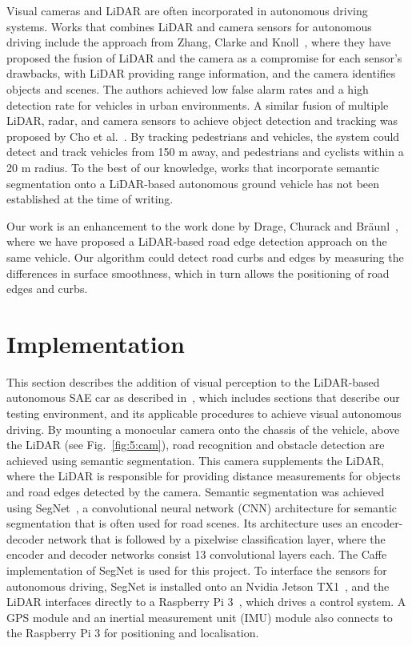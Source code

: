 Visual cameras and LiDAR are often incorporated in autonomous driving systems. Works that combines LiDAR and camera sensors for autonomous driving include the approach from Zhang, Clarke and Knoll~\cite{f._zhang_vehicle_2014}, where they have proposed the fusion of LiDAR and the camera as a compromise for each sensor's drawbacks, with LiDAR providing range information, and the camera identifies objects and scenes. The authors achieved low false alarm rates and a high detection rate for vehicles in urban environments.  A similar fusion of multiple LiDAR, radar, and camera sensors to achieve object detection and tracking was proposed by Cho et al.~\cite{h._cho_multi-sensor_2014}. By tracking pedestrians and vehicles, the system could detect and track vehicles from 150 m away, and pedestrians and cyclists within a 20 m radius. To the best of our knowledge, works that incorporate semantic segmentation onto a LiDAR-based autonomous ground vehicle has not been established at the time of writing. 

Our work is an enhancement to the work done by Drage, Churack and Br\"aunl~\cite{drage_lidar_2015}, where we have proposed a LiDAR-based road edge detection approach on the same vehicle. Our algorithm could detect road curbs and edges by measuring the differences in surface smoothness, which in turn allows the positioning of road edges and curbs.

\section{Implementation}
This section describes the addition of visual perception to the LiDAR-based autonomous SAE car as described in~\cite{drage_lidar_2015}, which includes sections that describe our testing environment, and its applicable procedures to achieve visual autonomous driving. By mounting a monocular camera onto the chassis of the vehicle,  above the LiDAR (see Fig.~\ref{fig:5:cam}), road recognition and obstacle detection are achieved using semantic segmentation. This camera supplements the LiDAR, where the LiDAR is responsible for providing distance measurements for objects and road edges detected by the camera. Semantic segmentation was achieved using SegNet~\cite{badrinarayanan_segnet:_2017}, a convolutional neural network (CNN) architecture for semantic segmentation that is often used for road scenes. Its architecture uses an encoder-decoder network that is followed by a pixelwise classification layer, where the encoder and decoder networks consist 13 convolutional layers each. The Caffe~\cite{jia_caffe:_2014} implementation of SegNet is used for this project. To interface the sensors for autonomous driving, SegNet is installed onto an Nvidia Jetson TX1~\cite{nvidia_corporation_embedded_2017-1}, and the LiDAR interfaces directly to a Raspberry Pi 3~\cite{raspberry_pi_foundation_raspberry_2017}, which drives a control system. A GPS module and an inertial measurement unit (IMU) module also connects to the Raspberry Pi 3 for positioning and localisation. 

